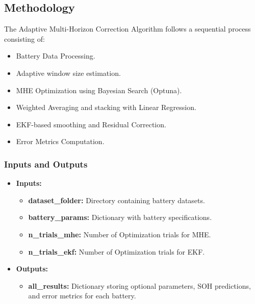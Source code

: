 \subsection{Methodology}
The Adaptive Multi-Horizon Correction Algorithm follows a sequential process consisting of:
\begin{itemize}
    \item Battery Data Processing.
    \item Adaptive window size estimation.
    \item MHE Optimization using Bayesian Search (Optuna).
    \item Weighted Averaging and stacking with Linear Regression.
    \item EKF-based smoothing and Residual Correction.
    \item Error Metrics Computation.
\end{itemize}

\subsubsection{Inputs and Outputs}
\begin{itemize}
    \item \textbf{Inputs:} \begin{itemize}
        \item \textbf{dataset\_folder:} Directory containing battery datasets.
        \item \textbf{battery\_params:} Dictionary with battery specifications.
        \item \textbf{n\_trials\_mhe:} Number of Optimization trials for MHE.
        \item \textbf{n\_trials\_ekf:} Number of Optimization trials for EKF.
    \end{itemize}
    \item \textbf{Outputs:} \begin{itemize}
        \item \textbf{all\_results:} Dictionary storing optional parameters, SOH predictions, and error metrics for each battery.
    \end{itemize}
\end{itemize}

